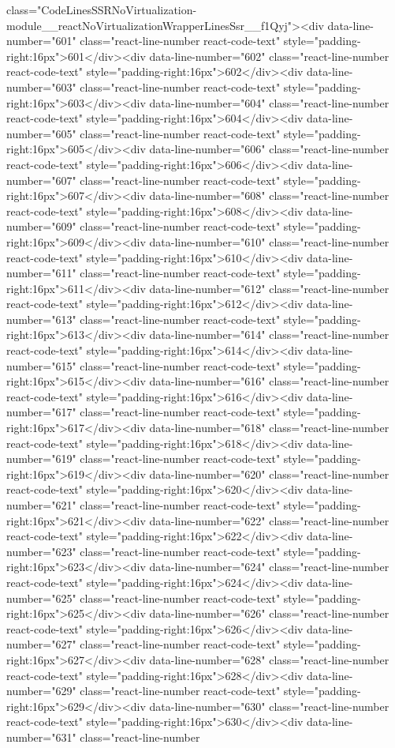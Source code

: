 {{{{{{{class="CodeLinesSSRNoVirtualization-module__reactNoVirtualizationWrapperLinesSsr__f1Qyj"><div data-line-number="601" class="react-line-number react-code-text" style="padding-right:16px">601</div><div data-line-number="602" class="react-line-number react-code-text" style="padding-right:16px">602</div><div data-line-number="603" class="react-line-number react-code-text" style="padding-right:16px">603</div><div data-line-number="604" class="react-line-number react-code-text" style="padding-right:16px">604</div><div data-line-number="605" class="react-line-number react-code-text" style="padding-right:16px">605</div><div data-line-number="606" class="react-line-number react-code-text" style="padding-right:16px">606</div><div data-line-number="607" class="react-line-number react-code-text" style="padding-right:16px">607</div><div data-line-number="608" class="react-line-number react-code-text" style="padding-right:16px">608</div><div data-line-number="609" class="react-line-number react-code-text" style="padding-right:16px">609</div><div data-line-number="610" class="react-line-number react-code-text" style="padding-right:16px">610</div><div data-line-number="611" class="react-line-number react-code-text" style="padding-right:16px">611</div><div data-line-number="612" class="react-line-number react-code-text" style="padding-right:16px">612</div><div data-line-number="613" class="react-line-number react-code-text" style="padding-right:16px">613</div><div data-line-number="614" class="react-line-number react-code-text" style="padding-right:16px">614</div><div data-line-number="615" class="react-line-number react-code-text" style="padding-right:16px">615</div><div data-line-number="616" class="react-line-number react-code-text" style="padding-right:16px">616</div><div data-line-number="617" class="react-line-number react-code-text" style="padding-right:16px">617</div><div data-line-number="618" class="react-line-number react-code-text" style="padding-right:16px">618</div><div data-line-number="619" class="react-line-number react-code-text" style="padding-right:16px">619</div><div data-line-number="620" class="react-line-number react-code-text" style="padding-right:16px">620</div><div data-line-number="621" class="react-line-number react-code-text" style="padding-right:16px">621</div><div data-line-number="622" class="react-line-number react-code-text" style="padding-right:16px">622</div><div data-line-number="623" class="react-line-number react-code-text" style="padding-right:16px">623</div><div data-line-number="624" class="react-line-number react-code-text" style="padding-right:16px">624</div><div data-line-number="625" class="react-line-number react-code-text" style="padding-right:16px">625</div><div data-line-number="626" class="react-line-number react-code-text" style="padding-right:16px">626</div><div data-line-number="627" class="react-line-number react-code-text" style="padding-right:16px">627</div><div data-line-number="628" class="react-line-number react-code-text" style="padding-right:16px">628</div><div data-line-number="629" class="react-line-number react-code-text" style="padding-right:16px">629</div><div data-line-number="630" class="react-line-number react-code-text" style="padding-right:16px">630</div><div data-line-number="631" class="react-line-number }}}}}}}
